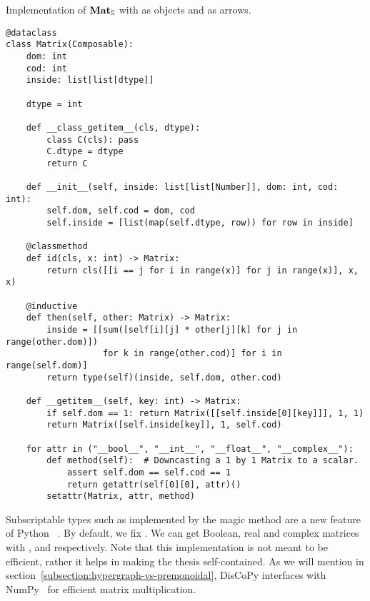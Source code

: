 \begin{python}\label{listing:matrix}
{\normalfont Implementation of $\mathbf{Mat}_\S$ with  as objects and  as arrows.}

\begin{verbatim}
@dataclass
class Matrix(Composable):
    dom: int
    cod: int
    inside: list[list[dtype]]

    dtype = int

    def __class_getitem__(cls, dtype):
        class C(cls): pass
        C.dtype = dtype
        return C

    def __init__(self, inside: list[list[Number]], dom: int, cod: int):
        self.dom, self.cod = dom, cod
        self.inside = [list(map(self.dtype, row)) for row in inside]

    @classmethod
    def id(cls, x: int) -> Matrix:
        return cls([[i == j for i in range(x)] for j in range(x)], x, x)

    @inductive
    def then(self, other: Matrix) -> Matrix:
        inside = [[sum([self[i][j] * other[j][k] for j in range(other.dom)])
                   for k in range(other.cod)] for i in range(self.dom)]
        return type(self)(inside, self.dom, other.cod)

    def __getitem__(self, key: int) -> Matrix:
        if self.dom == 1: return Matrix([[self.inside[0][key]]], 1, 1)
        return Matrix([self.inside[key]], 1, self.cod)

    for attr in ("__bool__", "__int__", "__float__", "__complex__"):
        def method(self):  # Downcasting a 1 by 1 Matrix to a scalar.
            assert self.dom == self.cod == 1
            return getattr(self[0][0], attr)()
        setattr(Matrix, attr, method)
\end{verbatim}

Subscriptable types such as  implemented by the magic method  are a new feature of Python ~\cite{Levkivskyi17}.
By default, we fix .
We can get Boolean, real and complex matrices with ,  and  respectively.
Note that this implementation is not meant to be efficient, rather it helps in making the thesis self-contained.
As we will mention in section~\ref{subsection:hypergraph-vs-premonoidal}, DisCoPy interfaces with NumPy~\cite{VanDerWaltEtAl11} for efficient matrix multiplication.
\end{python}


